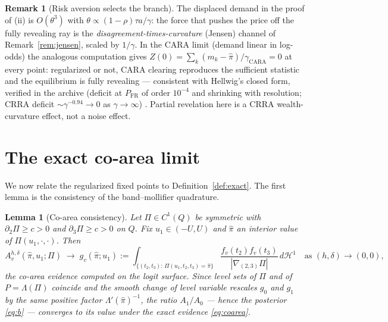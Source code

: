 \documentclass[11pt]{article}
\newtheorem{lemma}{Lemma}
\theoremstyle{definition}
\newtheorem{remark}{Remark}
\newcommand{\Lam}{\Lambda}
\newcommand{\Hc}{\mathcal{H}}
\begin{document}
\begin{remark}[Risk aversion selects the branch]
The displaced demand in the proof of (ii) is $O(\theta^3)$ with
$\theta\propto(1-\rho)\tau a/\gamma$: the force that pushes the price off
the fully revealing ray is the \emph{disagreement-times-curvature} (Jensen)
channel of Remark~\ref{rem:jensen}, scaled by $1/\gamma$. In the CARA limit
(demand linear in log-odds) the analogous computation gives
$Z(0)=\sum_k(m_k-\hat\pi)/\gamma_{\mathrm{CARA}}=0$ at every point:
regularized or not, CARA clearing reproduces the sufficient statistic and
the equilibrium is fully revealing — consistent with Hellwig's closed form,
verified in the archive (deficit at $P_{\mathrm{FR}}$ of order $10^{-4}$ and
shrinking with resolution; CRRA deficit $\sim\gamma^{-0.94}\to0$ as
$\gamma\to\infty$) \cite{Hellwig,REZN}. Partial revelation here is a CRRA
wealth-curvature effect, not a noise effect.
\end{remark}

\section{The exact co-area limit}\label{sec:limit}

We now relate the regularized fixed points to Definition~\ref{def:exact}.
The first lemma is the consistency of the band--mollifier quadrature.

\begin{lemma}[Co-area consistency]\label{lem:consistency}
Let $\Pi\in C^1(Q)$ be symmetric with
$\partial_2\Pi\ge c>0$ and $\partial_3\Pi\ge c>0$ on $Q$. Fix
$u_1\in(-U,U)$ and $\hat\pi$ an interior value of
$\Pi(u_1,\cdot,\cdot)$. Then
\[
A^{h,\delta}_v(\hat\pi,u_1;\Pi)\;\longrightarrow\;
g_v(\hat\pi;u_1):=
\int_{\{(t_2,t_3):\,\Pi(u_1,t_2,t_3)=\hat\pi\}}
\frac{f_v(t_2)f_v(t_3)}{|\nabla_{\!(2,3)}\Pi|}\,d\Hc^1
\quad\text{as }(h,\delta)\to(0,0),
\]
the co-area evidence computed on the logit surface. Since level sets of
$\Pi$ and of $P=\Lam(\Pi)$ coincide and the smooth change of level variable
rescales $g_0$ and $g_1$ by the same positive factor
$\Lam'(\hat\pi)^{-1}$, the ratio $A_1/A_0$ — hence the posterior
\eqref{eq:b} — converges to its value under the exact evidence
\eqref{eq:coarea}.
\end{lemma}
\end{document}
